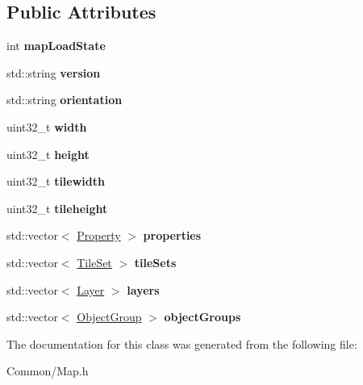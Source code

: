 \subsection*{Public Attributes}
\begin{DoxyCompactItemize}
\item 
\hypertarget{classbali_1_1_map_acefc5574570b216bc6bc379b63df850a}{int {\bfseries map\-Load\-State}}\label{classbali_1_1_map_acefc5574570b216bc6bc379b63df850a}

\item 
\hypertarget{classbali_1_1_map_aba89b9cccf94ae19087f68639447b2bb}{std\-::string {\bfseries version}}\label{classbali_1_1_map_aba89b9cccf94ae19087f68639447b2bb}

\item 
\hypertarget{classbali_1_1_map_aec53cac3503f60b244abd8382cdbf85d}{std\-::string {\bfseries orientation}}\label{classbali_1_1_map_aec53cac3503f60b244abd8382cdbf85d}

\item 
\hypertarget{classbali_1_1_map_af6ac75d2464f118421ee8c9839956695}{uint32\-\_\-t {\bfseries width}}\label{classbali_1_1_map_af6ac75d2464f118421ee8c9839956695}

\item 
\hypertarget{classbali_1_1_map_a84abc8ccaaff291f314a6f3c8eb68437}{uint32\-\_\-t {\bfseries height}}\label{classbali_1_1_map_a84abc8ccaaff291f314a6f3c8eb68437}

\item 
\hypertarget{classbali_1_1_map_aeca1f2b20d3c1dfd527534f2520315d6}{uint32\-\_\-t {\bfseries tilewidth}}\label{classbali_1_1_map_aeca1f2b20d3c1dfd527534f2520315d6}

\item 
\hypertarget{classbali_1_1_map_af4968980ebcf3b4570cba64721e7e39f}{uint32\-\_\-t {\bfseries tileheight}}\label{classbali_1_1_map_af4968980ebcf3b4570cba64721e7e39f}

\item 
\hypertarget{classbali_1_1_map_a0e195ee16e0771ecb5ed888201f4d2ce}{std\-::vector$<$ \hyperlink{structbali_1_1_map_1_1_property}{Property} $>$ {\bfseries properties}}\label{classbali_1_1_map_a0e195ee16e0771ecb5ed888201f4d2ce}

\item 
\hypertarget{classbali_1_1_map_aa223e9577d0815fafef3baa7e7b82b8d}{std\-::vector$<$ \hyperlink{classbali_1_1_map_1_1_tile_set}{Tile\-Set} $>$ {\bfseries tile\-Sets}}\label{classbali_1_1_map_aa223e9577d0815fafef3baa7e7b82b8d}

\item 
\hypertarget{classbali_1_1_map_a39b19de5cf95ade7d25a798582c8d602}{std\-::vector$<$ \hyperlink{structbali_1_1_map_1_1_layer}{Layer} $>$ {\bfseries layers}}\label{classbali_1_1_map_a39b19de5cf95ade7d25a798582c8d602}

\item 
\hypertarget{classbali_1_1_map_adfd83872e144c91376a94b622c9ccdc5}{std\-::vector$<$ \hyperlink{structbali_1_1_map_1_1_object_group}{Object\-Group} $>$ {\bfseries object\-Groups}}\label{classbali_1_1_map_adfd83872e144c91376a94b622c9ccdc5}

\end{DoxyCompactItemize}


The documentation for this class was generated from the following file\-:\begin{DoxyCompactItemize}
\item 
Common/Map.\-h\end{DoxyCompactItemize}
